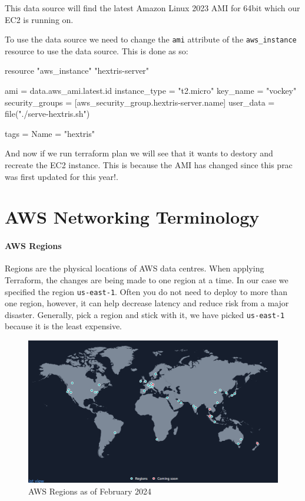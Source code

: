 \documentclass{csse4400}
\begin{document}
This data source will find the latest Amazon Linux 2023 AMI for 64bit which our EC2 is running on.

To use the data source we need to change the \texttt{ami} attribute of the \texttt{aws\_instance} resource to use the data source. This is done as so:

\begin{code}[language=terraform,numbers=none]{}
resource "aws_instance" "hextris-server" {
  ami           = data.aws_ami.latest.id
  instance_type = "t2.micro"
  key_name      = "vockey"
  security_groups = [aws_security_group.hextris-server.name]
  user_data = file("./serve-hextris.sh")

  tags = {
    Name = "hextris"
  }
}
\end{code}

And now if we run terraform plan we will see that it wants to destory and recreate the EC2 instance. This is because the AMI has changed since this prac was first updated for this year!.




\appendix

\section{AWS Networking Terminology}
\paragraph{AWS Regions}
Regions are the physical locations of AWS data centres.
When applying Terraform, the changes are being made to one region at a time.
In our case we specified the region \texttt{us-east-1}.
Often you do not need to deploy to more than one region, however,
it can help decrease latency and reduce risk from a major disaster.
Generally, pick a region and stick with it,
we have picked \texttt{us-east-1} because it is the least expensive.

\begin{figure}[ht]
\includegraphics[width=\textwidth]{images/aws_regions}
\caption{AWS Regions as of February 2024 \cite{aws-regions}}
\end{figure}
\end{document}
